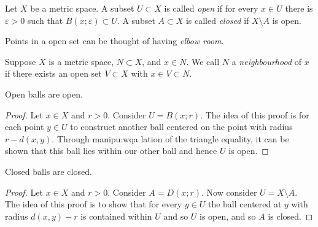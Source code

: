 
\begin{definition}
	Let $X$ be a metric space. 
	A subset $U \subset X$ is called \emph{open} if
	for every $x \in U$ 
	there is $\varepsilon > 0$ 
	such that $B(x;\varepsilon) \subset U$.
	A subset $A \subset X$ is called \emph{closed} if $X \setminus A$ is open.
\end{definition}

Points in a open set can be thought of having \emph{elbow room}.

\begin{definition}[Neighbourhood]
	Suppose $X$ is a metric space, $N \subset X$, and $x \in N$.
	We call $N$ a \emph{neighbourhood} of $x$ if there exists an open set
	$V \subset X$ with $x \in V \subset N$.
\end{definition}

\begin{proposition}[]
	Open balls are open.
\end{proposition}

\begin{proof}
	Let $x \in X$ and $r > 0$. Consider $U = B(x;r)$.
	The idea of this proof is for each point $y \in U$
	to construct another ball centered on the point
	with radius $r - d(x,y)$.
	Through manipu:wqa
	lation of the triangle equality, it can be shown
	that this ball lies within our other ball and hence $U$ is open.
\end{proof}

\begin{proposition}[]
	Closed balls are closed.
\end{proposition}

\begin{proof}
	Let $x \in X$ and $r > 0$. Consider $A = D(x;r)$.
	Now consider $U = X \setminus A$.
	The idea of this proof is to show that for every $y \in U$
	the ball centered at $y$ with radius $d(x,y) - r$ is contained
	within $U$ and so $U$ is open, and so $A$ is closed.
\end{proof}
